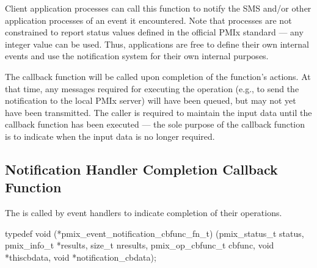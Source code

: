 Client application processes can call this function to notify the \ac{SMS} and/or other application processes of an event it encountered. Note that processes are not constrained to report status values defined in the official \ac{PMIx} standard --- any integer value can be used. Thus, applications are free to define their own internal events and use the notification system for their own internal purposes.

\adviceuserstart
The callback function will be called upon completion of the
 function's actions. At that time, any messages required for executing the operation (e.g., to send the notification to the local \ac{PMIx} server) will
have been queued, but may not yet have been transmitted. The caller is required to maintain the input
data until the callback function has been executed --- the sole purpose of the callback function is to indicate when the input data is no longer required.
\adviceuserend

\subsection{Notification Handler Completion Callback Function}

\summary

The  is called by event handlers to indicate completion of their operations.

\cspecificstart
\begin{codepar}
typedef void (*pmix_event_notification_cbfunc_fn_t)
    (pmix_status_t status,
     pmix_info_t *results, size_t nresults,
     pmix_op_cbfunc_t cbfunc, void *thiscbdata,
     void *notification_cbdata);
\end{codepar}
\cspecificend

\begin{arglist}
\end{arglist}

